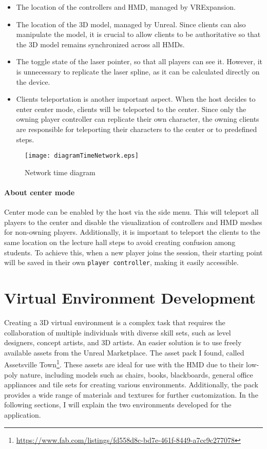 \begin{itemize}
    \item The location of the controllers and \ac{HMD}, managed by VRExpansion.
    \item The location of the 3D model, managed by Unreal. Since clients can also manipulate the model, it is crucial to allow clients to be authoritative so that the 3D model remains synchronized across all \ac{HMD}s.
    \item The toggle state of the laser pointer, so that all players can see it. However, it is unnecessary to replicate the laser spline, as it can be calculated directly on the device.
    \item Clients teleportation is another important aspect. When the host decides to enter center mode, clients will be teleported to the center. Since only the owning player controller can replicate their own character, the owning clients are responsible for teleporting their characters to the center or to predefined steps.
\end{itemize}


\begin{figure}[ht]
    \texttt{[image: diagramTimeNetwork.eps]}
    \caption{Network time diagram}
    \label{fig:networkTime}
\end{figure}

\paragraph{About center mode}
Center mode can be enabled by the host via the side menu. This will teleport all players to the center and disable the visualization of controllers and \ac{HMD} meshes for non-owning players. Additionally, it is important to teleport the clients to the same location on the lecture hall steps to avoid creating confusion among students.
To achieve this, when a new player joins the session, their starting point will be saved in their own \texttt{player controller}, making it easily accessible.

\section{Virtual Environment Development}
\noindent
Creating a 3D virtual environment is a complex task that requires the collaboration of multiple individuals with diverse skill sets, such as level designers, concept artists, and 3D artists.
An easier solution is to use freely available assets from the Unreal Marketplace. The asset pack I found, called Assetsville Town\footnote{\url{https://www.fab.com/listings/fd558d8c-bd7e-461f-8449-a7cc9c277078}}.
These assets are ideal for use with the \ac{HMD} due to their low-poly nature, including models such as chairs, books, blackboards, general office appliances and tile sets for creating various environments.
Additionally, the pack provides a wide range of materials and textures for further customization.
In the following sections, I will explain the two environments developed for the application.


